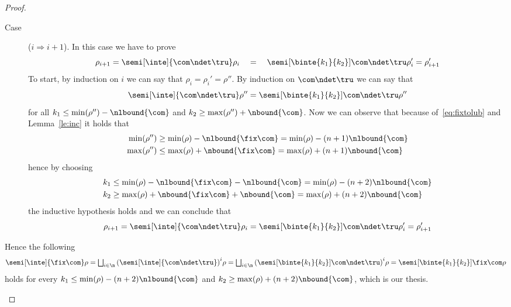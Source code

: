 \begin{proof}
\begin{inductive}
\begin{enumerate}[label=(\roman*)]
\begin{description}
      \item[Case] (\(i\Rightarrow i+1\)). In this case we have to
        prove
        \begin{equation*}
          \rho_{i+1} = \semi[\inte]{\com\ndet\tru}\rho_i \quad = \quad \semi[\binte{k_1}{k_2}]{\com\ndet\tru}\rho_i' = \rho_{i+1}'
        \end{equation*}
        To start, by induction on \(i\) we can say that
        \(\rho_i = \rho_i' = \rho''\). By induction on \(\com\ndet\tru\) we can
        say that
        \begin{equation}
          \semi[\inte]{\com\ndet\tru}\rho'' = \semi[\binte{k_1}{k_2}]{\com\ndet\tru}\rho''
        \end{equation}
        for all \(k_1 \leq \min(\rho'') - \nlbound{\com}\) and
        \(k_2 \geq \max(\rho'') + \nbound{\com}\). Now we can observe
        that because of~\eqref{eq:fixtolub} and Lemma~\ref{le:inc} it
        holds that
        \begin{align*}
          \min(\rho'') & \geq \min(\rho) - \nlbound{\fix\com} = \min(\rho) - (n+1)\nlbound{\com} \\
          \max(\rho'') & \leq \max(\rho) + \nbound{\fix\com} = \max(\rho) + (n+1)\nbound{\com}
        \end{align*}
        hence by choosing
        \begin{align*}
          k_1 & \leq \min(\rho) - \nlbound{\fix\com} - \nlbound{\com} = \min(\rho) - (n+2)\nlbound{\com} \\
          k_2 & \geq \max(\rho) + \nbound{\fix\com} + \nbound{\com} = \max(\rho) + (n+2)\nbound{\com}
        \end{align*}
        the inductive hypothesis holds and we can conclude that
        \begin{equation}
          \rho_{i+1} = \semi[\inte]{\com\ndet\tru}\rho_i = \semi[\binte{k_1}{k_2}]{\com\ndet\tru}\rho_i' = \rho_{i+1}'
        \end{equation}
      \end{description}
      Hence the following
      \begin{equation*}
        \semi[\inte]{\fix\com}\rho =
        \textstyle\bigsqcup_{i\in\n}{\left(\semi[\inte]{\com\ndet\tru}\right)}^i \rho =
        \textstyle\bigsqcup_{i\in\n}{\left(\semi[\binte{k_1}{k_2}]{\com\ndet\tru}\right)}^i \rho =
        \semi[\binte{k_1}{k_2}]{\fix\com}\rho
      \end{equation*}
      holds for every \(k_1 \leq \min(\rho) - (n+2)\nlbound{\com}\) and
      \(k_2 \geq \max(\rho) + (n+2)\nbound{\com}\), which is our
      thesis.
    \end{enumerate}
  \end{inductive}
\end{proof}

